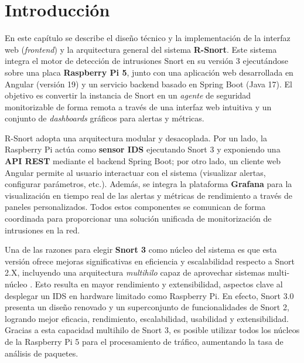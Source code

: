 \documentclass[11pt,a4paper,twoside]{report}
\begin{document}
\section{Introducción}
En este capítulo se describe el diseño técnico y la implementación de la interfaz web (\emph{frontend}) y la arquitectura general del sistema \textbf{R-Snort}. Este sistema integra el motor de detección de intrusiones Snort en su versión 3 ejecutándose sobre una placa \textbf{Raspberry Pi 5}, junto con una aplicación web desarrollada en Angular (versión 19) y un servicio backend basado en Spring Boot (Java 17). El objetivo es convertir la instancia de Snort en un \emph{agente} de seguridad monitorizable de forma remota a través de una interfaz web intuitiva y un conjunto de \emph{dashboards} gráficos para alertas y métricas.\newline

R-Snort adopta una arquitectura modular y desacoplada. Por un lado, la Raspberry Pi actúa como \textbf{sensor IDS} ejecutando Snort 3 y exponiendo una \textbf{API REST} mediante el backend Spring Boot; por otro lado, un cliente web Angular permite al usuario interactuar con el sistema (visualizar alertas, configurar parámetros, etc.). Además, se integra la plataforma \textbf{Grafana} para la visualización en tiempo real de las alertas y métricas de rendimiento a través de paneles personalizados. Todos estos componentes se comunican de forma coordinada para proporcionar una solución unificada de monitorización de intrusiones en la red.\newline

Una de las razones para elegir \textbf{Snort 3} como núcleo del sistema es que esta versión ofrece mejoras significativas en eficiencia y escalabilidad respecto a Snort 2.X, incluyendo una arquitectura \emph{multihilo} capaz de aprovechar sistemas multi-núcleo \cite{snort3differences}. Esto resulta en mayor rendimiento y extensibilidad, aspectos clave al desplegar un IDS en hardware limitado como Raspberry Pi. En efecto, Snort 3.0 presenta un diseño renovado y un superconjunto de funcionalidades de Snort 2, logrando mejor eficacia, rendimiento, escalabilidad, usabilidad y extensibilidad. Gracias a esta capacidad multihilo de Snort 3, es posible utilizar todos los núcleos de la Raspberry Pi 5 para el procesamiento de tráfico, aumentando la tasa de análisis de paquetes.\newline
\end{document}
